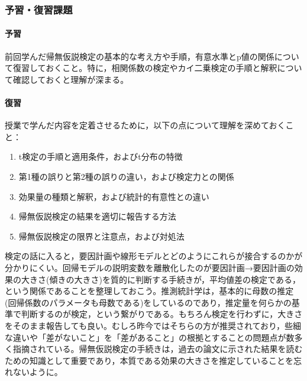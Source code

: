 \subsubsection{予習・復習課題}
\paragraph{予習}
前回学んだ帰無仮説検定の基本的な考え方や手順，有意水準とp値の関係について復習しておくこと。特に，相関係数の検定やカイ二乗検定の手順と解釈について確認しておくと理解が深まる。
\paragraph{復習}
授業で学んだ内容を定着させるために，以下の点について理解を深めておくこと：

\begin{enumerate}
\item t検定の手順と適用条件，およびt分布の特徴
\item 第1種の誤りと第2種の誤りの違い，および検定力との関係
\item 効果量の種類と解釈，および統計的有意性との違い
\item 帰無仮説検定の結果を適切に報告する方法
\item 帰無仮説検定の限界と注意点，および対処法
\end{enumerate}

検定の話に入ると，要因計画や線形モデルとどのようにこれらが接合するのかが分かりにくい。回帰モデルの説明変数を離散化したのが要因計画→要因計画の効果の大きさ(傾きの大きさ)を質的に判断する手続きが，平均値差の検定である，という関係であることを整理しておこう。推測統計学は，基本的に母数の推定(回帰係数のパラメータも母数である)をしているのであり，推定量を何らかの基準で判断するのが検定，という繋がりである。もちろん検定を行わずに，大きさをそのまま報告しても良い。むしろ昨今ではそちらの方が推奨されており，些細な違いや「差がないこと」を「差があること」の根拠とすることの問題点が数多く指摘されている。帰無仮説検定の手続きは，過去の論文に示された結果を読むための知識として重要であり，本質である効果の大きさを推定していることを忘れないように。